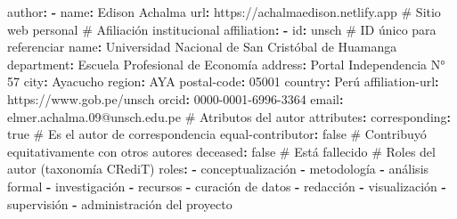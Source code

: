 \documentclass[
  doc,
  floatsintext,
  longtable,
  a4paper,
  nolmodern,
  notxfonts,
  notimes,
  12pt,
  colorlinks=true,linkcolor=blue,citecolor=blue,urlcolor=blue]{apa7}
\newenvironment{Shaded}{\begin{snugshade}}{\end{snugshade}}
\newcommand{\AttributeTok}[1]{\textcolor[rgb]{0.40,0.45,0.13}{#1}}
\newcommand{\CharTok}[1]{\textcolor[rgb]{0.13,0.47,0.30}{#1}}
\newcommand{\CommentTok}[1]{\textcolor[rgb]{0.37,0.37,0.37}{#1}}
\newcommand{\DecValTok}[1]{\textcolor[rgb]{0.68,0.00,0.00}{#1}}
\newcommand{\FunctionTok}[1]{\textcolor[rgb]{0.28,0.35,0.67}{#1}}
\newcommand{\KeywordTok}[1]{\textcolor[rgb]{0.00,0.23,0.31}{\textbf{#1}}}
\begin{document}
\begin{Shaded}
\begin{Highlighting}[]
\FunctionTok{author}\KeywordTok{:}
\AttributeTok{  }\KeywordTok{{-}}\AttributeTok{ }\FunctionTok{name}\KeywordTok{:}\AttributeTok{ Edison Achalma}
\AttributeTok{    }\FunctionTok{url}\KeywordTok{:}\AttributeTok{ https://achalmaedison.netlify.app}\CommentTok{   \# Sitio web personal}
\AttributeTok{    }
\CommentTok{    \# Afiliación institucional}
\AttributeTok{    }\FunctionTok{affiliation}\KeywordTok{:}
\AttributeTok{      }\KeywordTok{{-}}\AttributeTok{ }\FunctionTok{id}\KeywordTok{:}\AttributeTok{ unsch}\CommentTok{                             \# ID único para referenciar}
\AttributeTok{        }\FunctionTok{name}\KeywordTok{:}\AttributeTok{ Universidad Nacional de San Cristóbal de Huamanga}
\AttributeTok{        }\FunctionTok{department}\KeywordTok{:}\AttributeTok{ Escuela Profesional de Economía}
\AttributeTok{        }\FunctionTok{address}\KeywordTok{:}\AttributeTok{ Portal Independencia N° 57}
\AttributeTok{        }\FunctionTok{city}\KeywordTok{:}\AttributeTok{ Ayacucho}
\AttributeTok{        }\FunctionTok{region}\KeywordTok{:}\AttributeTok{ AYA}
\AttributeTok{        }\FunctionTok{postal{-}code}\KeywordTok{:}\AttributeTok{ }\DecValTok{05001}
\AttributeTok{        }\FunctionTok{country}\KeywordTok{:}\AttributeTok{ Perú}
\AttributeTok{    }
\AttributeTok{    }\FunctionTok{affiliation{-}url}\KeywordTok{:}\AttributeTok{ https://www.gob.pe/unsch}
\AttributeTok{    }\FunctionTok{orcid}\KeywordTok{:}\AttributeTok{ 0000{-}0001{-}6996{-}3364}
\AttributeTok{    }\FunctionTok{email}\KeywordTok{:}\AttributeTok{ elmer.achalma.09@unsch.edu.pe}
\AttributeTok{    }
\CommentTok{    \# Atributos del autor}
\AttributeTok{    }\FunctionTok{attributes}\KeywordTok{:}
\AttributeTok{      }\FunctionTok{corresponding}\KeywordTok{:}\AttributeTok{ }\CharTok{true}\CommentTok{      \# Es el autor de correspondencia}
\AttributeTok{      }\FunctionTok{equal{-}contributor}\KeywordTok{:}\AttributeTok{ }\CharTok{false}\CommentTok{ \# Contribuyó equitativamente con otros autores}
\AttributeTok{      }\FunctionTok{deceased}\KeywordTok{:}\AttributeTok{ }\CharTok{false}\CommentTok{          \# Está fallecido }
\CommentTok{    \# Roles del autor (taxonomía CRediT)}
\AttributeTok{    }\FunctionTok{roles}\KeywordTok{:}
\AttributeTok{      }\KeywordTok{{-}}\AttributeTok{ conceptualización}
\AttributeTok{      }\KeywordTok{{-}}\AttributeTok{ metodología}
\AttributeTok{      }\KeywordTok{{-}}\AttributeTok{ análisis formal}
\AttributeTok{      }\KeywordTok{{-}}\AttributeTok{ investigación}
\AttributeTok{      }\KeywordTok{{-}}\AttributeTok{ recursos}
\AttributeTok{      }\KeywordTok{{-}}\AttributeTok{ curación de datos}
\AttributeTok{      }\KeywordTok{{-}}\AttributeTok{ redacción}
\AttributeTok{      }\KeywordTok{{-}}\AttributeTok{ visualización}
\AttributeTok{      }\KeywordTok{{-}}\AttributeTok{ supervisión}
\AttributeTok{      }\KeywordTok{{-}}\AttributeTok{ administración del proyecto}
\end{Highlighting}
\end{Shaded}
\end{document}
